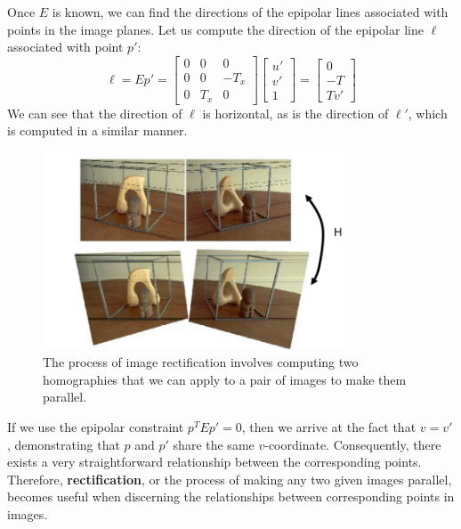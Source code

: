 \documentclass[a4paper, 12pt]{article}
\renewcommand\emph{\textbf}
\begin{document}
Once $E$ is known, we can find the directions of the epipolar lines associated with points in the image planes. Let us compute the direction of the epipolar line $\ell$ associated with point $p'$:
\begin{equation}
\ell = Ep' = \begin{bmatrix} 0 & 0 & 0\\ 0 & 0 & -T_x \\ 0 & T_x  & 0 \end{bmatrix} \begin{bmatrix}u'\\v'\\1\end{bmatrix} = \begin{bmatrix} 0\\ -T \\ Tv'\end{bmatrix}
\end{equation}
We can see that the direction of $\ell$ is horizontal, as is the direction of $\ell'$, which is computed in a similar manner.
\begin{figure}[h!]
\centering
\includegraphics[width=0.8\textwidth]{figures/rectification_example.png}
\caption{The process of image rectification involves computing two homographies that we can apply to a pair of images to make them parallel.}
\label{fig:rectification_example}
\end{figure}
 

If we use the epipolar constraint $p^TEp'=0$, then we arrive at the fact that $v=v'$, demonstrating that $p$ and $p'$ share the same $v$-coordinate. Consequently, there exists a very straightforward relationship between the corresponding points. Therefore, \emph{rectification}, or the process of making any two given images parallel, becomes useful when discerning the relationships between corresponding points in images.
\end{document}
